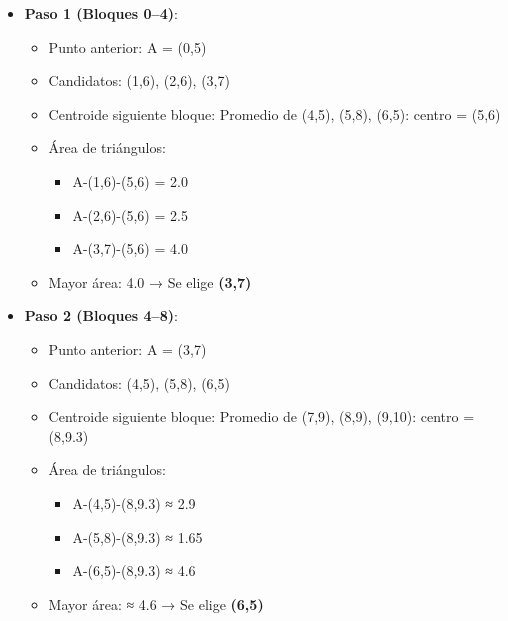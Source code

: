 \begin{itemize}
    \item \textbf{Paso 1 (Bloques 0--4)}:
    \begin{itemize}
        \item Punto anterior: A = (0,5)
        \item Candidatos: (1,6), (2,6), (3,7)
        \item Centroide siguiente bloque: Promedio de (4,5), (5,8), (6,5): centro = (5,6)
        \item Área de triángulos:
        \begin{itemize}
            \item A-(1,6)-(5,6) = 2.0
            \item A-(2,6)-(5,6) = 2.5
            \item A-(3,7)-(5,6) = 4.0
        \end{itemize}
        \item Mayor área: 4.0 → Se elige \textbf{(3,7)}
    \end{itemize}

    \item \textbf{Paso 2 (Bloques 4--8)}:
    \begin{itemize}
        \item Punto anterior: A = (3,7)
        \item Candidatos: (4,5), (5,8), (6,5)
        \item Centroide siguiente bloque: Promedio de (7,9), (8,9), (9,10): centro = (8,9.3)
        \item Área de triángulos:
        \begin{itemize}
            \item A-(4,5)-(8,9.3) ≈ 2.9
            \item A-(5,8)-(8,9.3) ≈ 1.65
            \item A-(6,5)-(8,9.3) ≈ 4.6
        \end{itemize}
        \item Mayor área: ≈ 4.6 → Se elige \textbf{(6,5)}
    \end{itemize}


\end{itemize}
